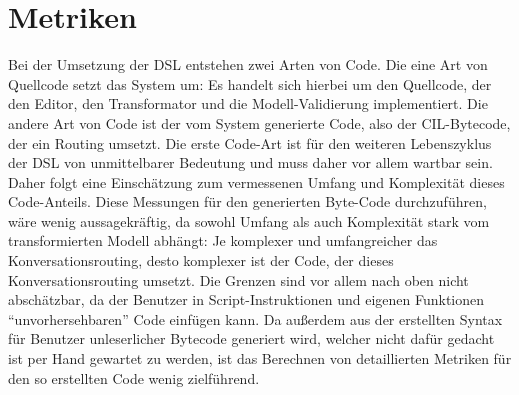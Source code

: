 \section{Metriken}
Bei der Umsetzung der DSL entstehen zwei Arten von Code. Die eine Art von Quellcode setzt das System um: Es handelt sich hierbei um den Quellcode, der den Editor, den Transformator und die Modell-Validierung implementiert. Die andere Art von Code ist der vom System generierte Code, also der CIL-Bytecode, der ein Routing umsetzt. Die erste Code-Art ist für den weiteren Lebenszyklus der DSL von unmittelbarer Bedeutung und muss daher vor allem wartbar sein. Daher folgt eine Einschätzung zum vermessenen Umfang und Komplexität dieses Code-Anteils. Diese Messungen für den generierten Byte-Code durchzuführen, wäre  wenig aussagekräftig, da sowohl Umfang als auch Komplexität stark vom transformierten Modell abhängt: Je komplexer und umfangreicher das Konversationsrouting, desto komplexer ist der Code, der dieses Konversationsrouting umsetzt. Die Grenzen sind vor allem nach oben nicht abschätzbar, da der Benutzer in Script-Instruktionen und eigenen Funktionen ``unvorhersehbaren'' Code einfügen kann. Da außerdem aus der erstellten Syntax für Benutzer unleserlicher Bytecode generiert wird, welcher nicht dafür gedacht ist per Hand gewartet zu werden, ist das Berechnen von detaillierten Metriken für den so erstellten Code wenig zielführend. 

